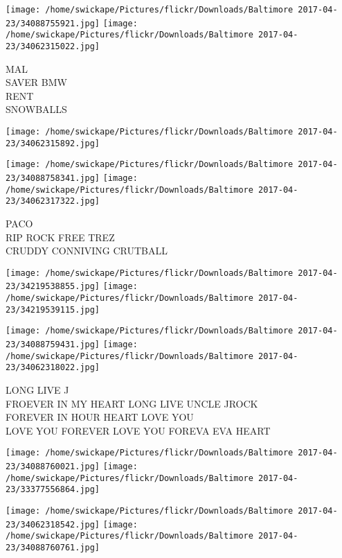 \documentclass[10pt,letterpaper]{article}
\begin{document}
\texttt{[image: /home/swickape/Pictures/flickr/Downloads/Baltimore 2017-04-23/34088755921.jpg]}
\texttt{[image: /home/swickape/Pictures/flickr/Downloads/Baltimore 2017-04-23/34062315022.jpg]}

MAL\\
SAVER BMW\\
RENT\\
SNOWBALLS\\
\pagebreak

\texttt{[image: /home/swickape/Pictures/flickr/Downloads/Baltimore 2017-04-23/34062315892.jpg]}

\vspace{0.25in}
\texttt{[image: /home/swickape/Pictures/flickr/Downloads/Baltimore 2017-04-23/34088758341.jpg]}
\texttt{[image: /home/swickape/Pictures/flickr/Downloads/Baltimore 2017-04-23/34062317322.jpg]}

PACO\\
RIP ROCK FREE TREZ\\
CRUDDY CONNIVING CRUTBALL\\
\pagebreak

\texttt{[image: /home/swickape/Pictures/flickr/Downloads/Baltimore 2017-04-23/34219538855.jpg]}
\texttt{[image: /home/swickape/Pictures/flickr/Downloads/Baltimore 2017-04-23/34219539115.jpg]}

\texttt{[image: /home/swickape/Pictures/flickr/Downloads/Baltimore 2017-04-23/34088759431.jpg]}
\texttt{[image: /home/swickape/Pictures/flickr/Downloads/Baltimore 2017-04-23/34062318022.jpg]}

LONG LIVE J\\
FROEVER IN MY HEART LONG LIVE UNCLE JROCK\\
FOREVER IN HOUR HEART LOVE YOU\\
LOVE YOU FOREVER LOVE YOU FOREVA EVA HEART\\
\pagebreak

\texttt{[image: /home/swickape/Pictures/flickr/Downloads/Baltimore 2017-04-23/34088760021.jpg]}
\texttt{[image: /home/swickape/Pictures/flickr/Downloads/Baltimore 2017-04-23/33377556864.jpg]}

\texttt{[image: /home/swickape/Pictures/flickr/Downloads/Baltimore 2017-04-23/34062318542.jpg]}
\texttt{[image: /home/swickape/Pictures/flickr/Downloads/Baltimore 2017-04-23/34088760761.jpg]}
\end{document}
